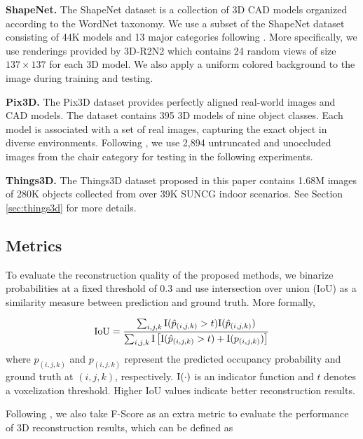 \documentclass[twocolumn]{svjour3}
\begin{document}
\noindent \textbf{ShapeNet.}
The ShapeNet dataset \citep{DBLP:conf/cvpr/WuSKYZTX15} is a collection of 3D CAD models organized according to the WordNet taxonomy.
We use a subset of the ShapeNet dataset consisting of 44K models and 13 major categories following \cite{DBLP:conf/eccv/ChoyXGCS16}.
More specifically, we use renderings provided by 3D-R2N2 which contains 24 random views of size $137 \times 137$ for each 3D model.
We also apply a uniform colored background to the image during training and testing.

\noindent \textbf{Pix3D.}
The Pix3D dataset \citep{DBLP:conf/cvpr/Sun0ZZZXTF18} provides perfectly aligned real-world images and CAD models.
The dataset contains 395 3D models of nine object classes.
Each model is associated with a set of real images, capturing the exact object in diverse environments.
Following \cite{DBLP:conf/cvpr/Sun0ZZZXTF18}, we use 2,894 untruncated and unoccluded images from the chair category for testing in the following experiments.

\noindent \textbf{Things3D.}
The Things3D dataset proposed in this paper contains 1.68M images of 280K objects collected from over 39K SUNCG \citep{DBLP:conf/cvpr/SongYZCSF17} indoor scenarios.
See Section \ref{sec:things3d} for more details.

\subsection{Metrics}

To evaluate the reconstruction quality of the proposed methods, we binarize probabilities at a fixed threshold of 0.3 and use intersection over union (IoU) as a similarity measure between prediction and ground truth.
More formally,

\begin{equation}
  {\rm IoU} = \frac{\sum_{i, j, k} {\rm I}(\hat{p}_{(i, j, k)} > t) {\rm I}(\hat{p}_{(i, j, k)})}{\sum_{i, j, k} {\rm I}\left[ {\rm I}(\hat{p}_{(i, j, k)} > t) + {\rm I}(p_{(i, j, k)}) \right]}
\end{equation}
where $\hat{p}_{(i, j, k)}$ and $p_{(i, j, k)}$ represent the predicted occupancy probability and ground truth at $(i, j, k)$, respectively.
${\rm I}(\cdot)$ is an indicator function and $t$ denotes a voxelization threshold.
Higher IoU values indicate better reconstruction results.

Following \cite{DBLP:conf/cvpr/TatarchenkoRRLK19}, we also take F-Score as an extra metric to evaluate the performance of 3D reconstruction results, which can be defined as
\end{document}
